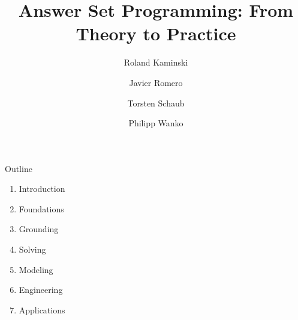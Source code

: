 \documentclass[t,fleqn]{beamer}
\title[Answer Set Programming]{Answer Set Programming: From Theory to Practice}
\author[Potassco]{Roland Kaminski \and Javier Romero \and Torsten Schaub \and Philipp Wanko}
\institute[KRR@UP]{University of Potsdam\\\bigskip\bigskip\texttt{[image: potassco\_logo\_lightblue]}}
\date{}
\begin{document}
\frame{\titlepage}
\begin{frame}{Outline}
  \bigskip
  \begin{enumerate}
  \item Introduction
  \item Foundations
  \item Grounding
  \item Solving
  \item Modeling
  \item Engineering
  \item Applications
  \end{enumerate}
\end{frame}










\end{document}

